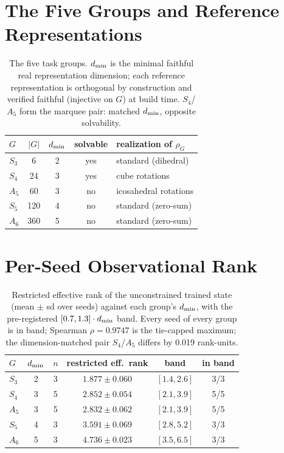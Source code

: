 \appendix

\section{The Five Groups and Reference Representations}
\label{app:groups}

\begin{table}[H]
\centering
\small
\begin{tabular}{lcccl}
\toprule
$G$ & $|G|$ & $d_{\min}$ & solvable & realization of $\rho_G$ \\
\midrule
$S_3$ & 6   & 2 & yes & standard (dihedral) \\
$S_4$ & 24  & 3 & yes & cube rotations \\
$A_5$ & 60  & 3 & no  & icosahedral rotations \\
$S_5$ & 120 & 4 & no  & standard (zero-sum) \\
$A_6$ & 360 & 5 & no  & standard (zero-sum) \\
\bottomrule
\end{tabular}
\caption{The five task groups. $d_{\min}$ is the minimal faithful real
representation dimension; each reference representation is orthogonal by
construction and verified faithful (injective on $G$) at build time.
$S_4$/$A_5$ form the marquee pair: matched $d_{\min}$, opposite solvability.}
\label{tab:groups}
\end{table}

\section{Per-Seed Observational Rank}
\label{app:m1}

\begin{table}[H]
\centering
\small
\begin{tabular}{lccccc}
\toprule
$G$ & $d_{\min}$ & $n$ & restricted eff.\ rank & band & in band \\
\midrule
$S_3$ & 2 & 3 & $1.877 \pm 0.060$ & $[1.4, 2.6]$ & 3/3 \\
$S_4$ & 3 & 5 & $2.852 \pm 0.054$ & $[2.1, 3.9]$ & 5/5 \\
$A_5$ & 3 & 5 & $2.832 \pm 0.062$ & $[2.1, 3.9]$ & 5/5 \\
$S_5$ & 4 & 3 & $3.591 \pm 0.069$ & $[2.8, 5.2]$ & 3/3 \\
$A_6$ & 5 & 3 & $4.736 \pm 0.023$ & $[3.5, 6.5]$ & 3/3 \\
\bottomrule
\end{tabular}
\caption{Restricted effective rank of the unconstrained trained state
(mean $\pm$ sd over seeds) against each group's $d_{\min}$, with the
pre-registered $[0.7, 1.3] \cdot d_{\min}$ band. Every seed of every group is
in band; Spearman $\rho = 0.9747$ is the tie-capped maximum; the
dimension-matched pair $S_4$/$A_5$ differs by 0.019 rank-units.}
\label{tab:m1}
\end{table}


